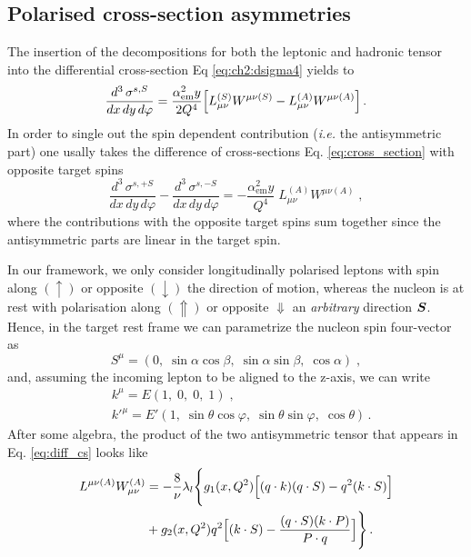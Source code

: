 \subsection{Polarised cross-section asymmetries}
The insertion of the decompositions for both the leptonic and hadronic tensor into the differential cross-section Eq \eqref{eq:ch2:dsigma4} yields to 
\begin{equation}
  \frac{d^3 \, \sigma^{s,S}}{dx \, dy \, d\varphi} = \frac{\alpha_{\textrm{em}}^2 y}{2 Q^4} \Bigl[ L^{(S)}_{\mu\nu} W^{\mu\nu(S)} - L^{(A)}_{\mu\nu} W^{\mu\nu(A)}  \Bigr]\,.
  \label{eq:cross_section}
\end{equation}
In order to single out the spin dependent contribution (\textit{i.e.} the antisymmetric part) one usally takes the difference of cross-sections Eq. \eqref{eq:cross_section} with opposite target spins 
\begin{equation}
  \frac{d^3 \, \sigma^{s,+S}}{dx \, dy \, d\varphi} - \frac{d^3 \, \sigma^{s,-S}}{dx \, dy \, d\varphi} = - \frac{\alpha_{\textrm{em}}^2 y}{Q^4} \; L^{(A)}_{\mu\nu} W^{\mu\nu(A)} \;,
  \label{eq:diff_cs}
\end{equation}
where the contributions with the opposite target spins sum together since the antisymmetric parts are linear in the target spin.\par
In our framework, we only consider longitudinally polarised leptons with spin along $(\uparrow)$ or opposite $(\downarrow)$ the direction of motion, whereas the nucleon is at rest with polarisation along $(\Uparrow)$ or opposite $\Downarrow$ an \textit{arbitrary} direction $\vb*{S}$. Hence, in the target rest frame we can parametrize the nucleon spin four-vector as
\begin{equation}
  S^{\mu} = (0, \; \sin \alpha \cos\beta, \; \sin \alpha \sin \beta, \; \cos \alpha) \;,
  \label{eq:par_S}
\end{equation}
and, assuming the incoming lepton to be aligned to the z-axis, we can write
\begin{equation}
  \begin{split}
    & k^{\mu} = E (1,\; 0,\; 0,\; 1)\;, \\
    & k'^{\mu} = E'( 1,\; \sin\theta \cos \varphi,\; \sin\theta \sin \varphi, \; \cos \theta )\,.
    \label{eq:par_k}
  \end{split}
\end{equation} 
After some algebra, the product of the two antisymmetric tensor that appears in Eq. \eqref{eq:diff_cs} looks like 
\begin{equation}
  \begin{split}
    L^{\mu \nu (A)} W_{\mu \nu}^{(A)} & = - \frac{8}{\nu} \lambda_{l} \Biggl\{ g_1(x,Q^2) \Bigl[ (q \cdot k)(q \cdot S) - q^2 (k \cdot S) \Bigr] \Biggr. \\
    & +  \Biggl. g_2 (x, Q^2) q^2\Bigl[ (k \cdot S) - \frac{(q \cdot S) (k \cdot P)}{P \cdot q} \Bigr] \Biggr\}\,.
  \end{split}
\end{equation}
